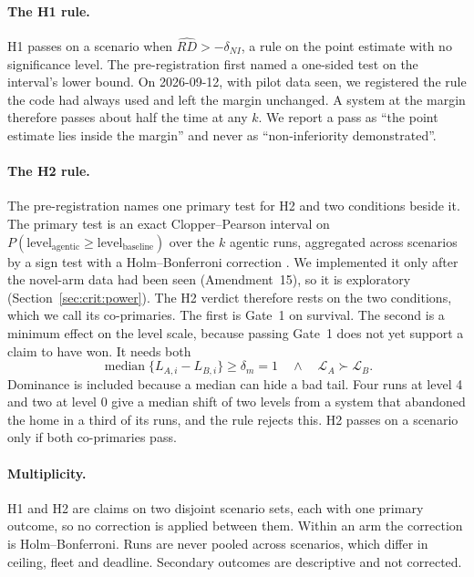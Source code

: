 \paragraph{The H1 rule.} H1 passes on a scenario when
$\widehat{RD} > -\delta_{NI}$, a rule on the point estimate with no
significance level. The pre-registration first named a one-sided test on the
interval's lower bound. On 2026-09-12, with pilot data seen, we registered the
rule the code had always used and left the margin unchanged. A system at the
margin therefore passes about half the time at any $k$. We report a pass as
``the point estimate lies inside the margin'' and never as ``non-inferiority
demonstrated''.

\paragraph{The H2 rule.} The pre-registration names one primary test for H2
and two conditions beside it. The primary test is an exact Clopper--Pearson
interval \parencite{clopper1934} on
$P(\text{level}_{\text{agentic}} \geq \text{level}_{\text{baseline}})$ over the
$k$ agentic runs, aggregated across scenarios by a sign test with a
Holm--Bonferroni correction \parencite{holm1979}. We implemented it only after
the novel-arm data had been seen (Amendment~15), so it is exploratory
(Section~\ref{sec:crit:power}). The H2 verdict therefore rests on the two
conditions, which we call its co-primaries. The first is Gate~1 on survival.
The second is a minimum effect on the level scale, because passing Gate~1 does
not yet support a claim to have won. It needs both
\begin{equation}
\operatorname{median}\big\{L_{A,i} - L_{B,i}\big\} \geq \delta_m = 1
\quad\wedge\quad
\mathcal L_A \succ \mathcal L_B.
\label{eq:eval:h2}
\end{equation}
Dominance is included because a median can hide a bad tail. Four runs at level
4 and two at level 0 give a median shift of two levels from a system that
abandoned the home in a third of its runs, and the rule rejects this. H2
passes on a scenario only if both co-primaries pass.

\paragraph{Multiplicity.} H1 and H2 are claims on two disjoint scenario sets,
each with one primary outcome, so no correction is applied between them. Within
an arm the correction is Holm--Bonferroni. Runs are never pooled across
scenarios, which differ in ceiling, fleet and deadline. Secondary outcomes are
descriptive and not corrected.


